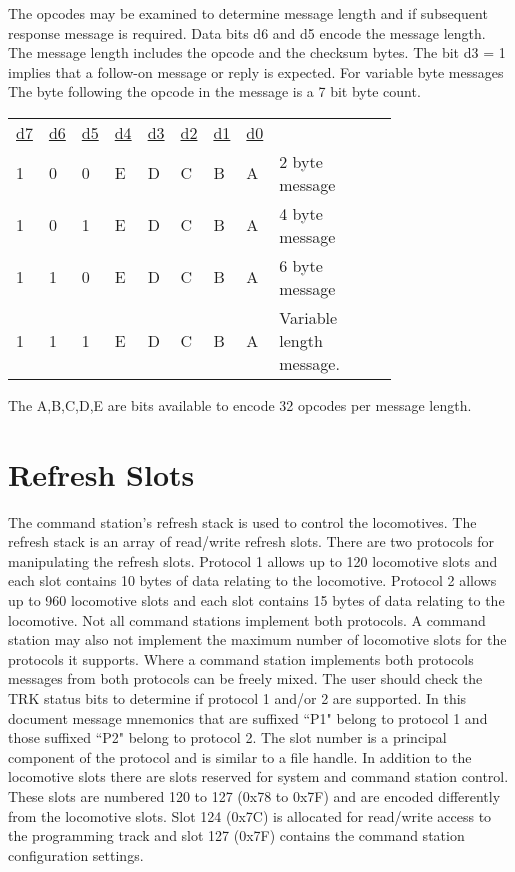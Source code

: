 The opcodes may be examined to determine message length and if subsequent response message is required. Data bits d6 and d5 encode the message length. The message length includes the opcode and the checksum bytes. The bit d3 = 1 implies that a follow-on message or reply is expected. For variable byte messages  The byte following the opcode in the message is a 7 bit byte count.

\begin{tabular}{p{0.05\linewidth} p{0.05\linewidth}  p{0.05\linewidth}  p{0.05\linewidth}  p{0.05\linewidth}  p{0.05\linewidth}  p{0.05\linewidth}  p{0.05\linewidth} p{0.36\linewidth}} 
\underline{d7} & \underline{d6} & \underline{d5} & \underline{d4} & \underline{d3} & \underline{d2} & \underline{d1} & \underline{d0} & \\
1 & 0 & 0 & E & D & C & B & A & 2 byte message\\
1 & 0 & 1 & E & D & C & B & A & 4 byte message\\
1 & 1 & 0 & E & D & C & B & A & 6 byte message\\
1 & 1 & 1 & E & D & C & B & A & Variable length message.\\
\end{tabular}

The A,B,C,D,E are bits available to encode 32 opcodes per message length.

\section{Refresh Slots}

The command station's refresh stack is used to control the locomotives. The refresh stack is an array of read/write refresh slots. There are two protocols for manipulating the refresh slots. Protocol 1 allows up to 120 locomotive slots and each slot contains 10 bytes of data relating to the locomotive. Protocol 2 allows up to 960 locomotive slots and each slot contains 15 bytes of data relating to the locomotive. Not all command stations implement both protocols. A command station may also not implement the maximum number of locomotive slots for the protocols it supports. Where a command station implements both protocols messages from both protocols can be freely mixed. The user should check the TRK status bits to determine if protocol 1 and/or 2 are supported. In this document message mnemonics that are suffixed ``P1" belong to protocol 1 and those suffixed ``P2" belong to protocol 2. The slot number is a principal component of the protocol and is similar to a file handle. In addition to the locomotive slots there are slots reserved for system and command station control. These slots are numbered 120 to 127 (0x78 to 0x7F) and are encoded differently from the locomotive slots. Slot 124 (0x7C) is allocated for read/write access to the programming track and slot 127 (0x7F) contains the command station configuration settings.


